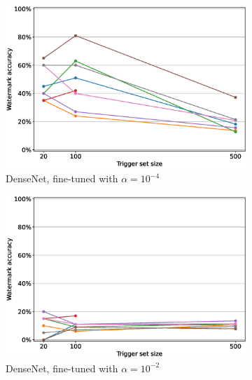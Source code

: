 \begin{figure}
    \centering
    \begin{subfigure}{0.41\linewidth}
        \includegraphics[width=\linewidth]{images/finetuning/densenet_finetuning_per_arch_00001.eps}
        \caption{DenseNet, fine-tuned with $\alpha=10^{-4}$}
        \label{fig:finetuning-smalllr-allmethods-perarch-densenet}
    \end{subfigure}
    \quad
    \begin{subfigure}{0.41\linewidth}
        \includegraphics[width=\linewidth]{images/finetuning/densenet_finetuning_per_arch_001.eps}
        \caption{DenseNet, fine-tuned with $\alpha=10^{-2}$}
        \label{fig:finetuning-largelr-allmethods-perarch-densenet}
    \end{subfigure}
    \quad
    \begin{subfigure}{0.41\linewidth}

\end{subfigure}
\end{figure}
